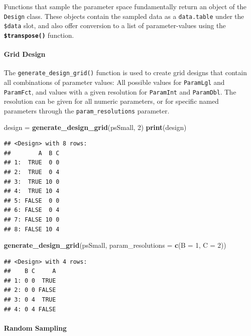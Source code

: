 \documentclass[]{article}
\newenvironment{Shaded}{\begin{snugshade}}{\end{snugshade}}
\newcommand{\DataTypeTok}[1]{\textcolor[rgb]{0.13,0.29,0.53}{#1}}
\newcommand{\DecValTok}[1]{\textcolor[rgb]{0.00,0.00,0.81}{#1}}
\newcommand{\KeywordTok}[1]{\textcolor[rgb]{0.13,0.29,0.53}{\textbf{#1}}}
\newcommand{\NormalTok}[1]{#1}
\newcommand{\StringTok}[1]{\textcolor[rgb]{0.31,0.60,0.02}{#1}}
\let\oldparagraph\paragraph
\renewcommand{\paragraph}[1]{\oldparagraph{#1}\mbox{}}
\renewenvironment{Shaded} {\begin{snugshade}\small} {\end{snugshade}}
\begin{document}
Functions that sample the parameter space fundamentally return an object of the \texttt{Design} class.
These objects contain the sampled data as a \texttt{data.table} under the \texttt{\$data} slot, and also offer conversion to a list of parameter-values using the \textbf{\texttt{\$transpose()}} function.

\hypertarget{grid-design}{%
\paragraph{Grid Design}\label{grid-design}}

The \texttt{generate\_design\_grid()} function is used to create grid designs that contain all combinations of parameter values: All possible values for \texttt{ParamLgl} and \texttt{ParamFct}, and values with a given resolution for \texttt{ParamInt} and \texttt{ParamDbl}.
The resolution can be given for all numeric parameters, or for specific named parameters through the \texttt{param\_resolutions} parameter.

\begin{Shaded}
\begin{Highlighting}[]
\NormalTok{design =}\StringTok{ }\KeywordTok{generate_design_grid}\NormalTok{(psSmall, }\DecValTok{2}\NormalTok{)}
\KeywordTok{print}\NormalTok{(design)}
\end{Highlighting}
\end{Shaded}

\begin{verbatim}
## <Design> with 8 rows:
##        A  B C
## 1:  TRUE  0 0
## 2:  TRUE  0 4
## 3:  TRUE 10 0
## 4:  TRUE 10 4
## 5: FALSE  0 0
## 6: FALSE  0 4
## 7: FALSE 10 0
## 8: FALSE 10 4
\end{verbatim}

\begin{Shaded}
\begin{Highlighting}[]
\KeywordTok{generate_design_grid}\NormalTok{(psSmall, }\DataTypeTok{param_resolutions =} \KeywordTok{c}\NormalTok{(}\DataTypeTok{B =} \DecValTok{1}\NormalTok{, }\DataTypeTok{C =} \DecValTok{2}\NormalTok{))}
\end{Highlighting}
\end{Shaded}

\begin{verbatim}
## <Design> with 4 rows:
##    B C     A
## 1: 0 0  TRUE
## 2: 0 0 FALSE
## 3: 0 4  TRUE
## 4: 0 4 FALSE
\end{verbatim}

\hypertarget{random-sampling}{%
\paragraph{Random Sampling}\label{random-sampling}}
\end{document}
